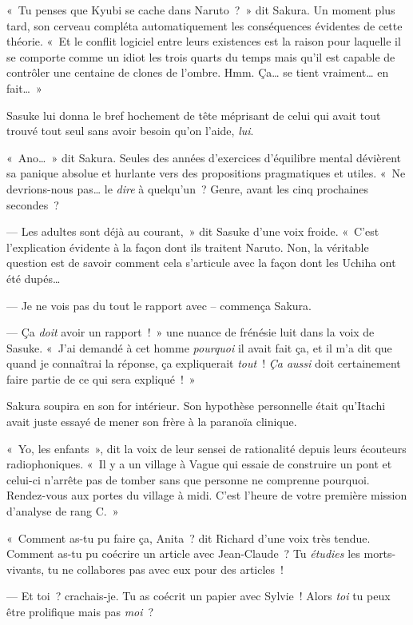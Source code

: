«~Tu penses que Kyubi se cache dans Naruto~?~»
dit Sakura.
Un moment plus tard, son cerveau compléta automatiquement les conséquences évidentes de cette théorie.
«~Et le conflit logiciel entre leurs existences est la raison pour laquelle il se comporte comme un idiot les trois quarts du temps mais qu'il est capable de contrôler une centaine de clones de l'ombre.
Hmm. Ça… se tient vraiment… en fait…~»

Sasuke lui donna le bref hochement de tête méprisant de celui qui avait tout trouvé tout seul sans avoir besoin qu'on l'aide, \emph{lui}.

«~Ano…~» dit Sakura.
Seules des années d'exercices d'équilibre mental dévièrent sa panique absolue et hurlante vers des propositions pragmatiques et utiles.
«~Ne devrions-nous pas… le \emph{dire} à quelqu'un~?
Genre, avant les cinq prochaines secondes~?

--- Les adultes sont déjà au courant,~» dit Sasuke d'une voix froide.
«~C'est l'explication évidente à la façon dont ils traitent Naruto.
Non, la véritable question est de savoir comment cela s'articule avec la façon dont les Uchiha ont été dupés…

--- Je ne vois pas du tout le rapport avec -- commença Sakura.

--- Ça \emph{doit} avoir un rapport~!~»
une nuance de frénésie luit dans la voix de Sasuke.
«~J'ai demandé à cet homme \emph{pourquoi} il avait fait ça, et il m'a dit que quand je connaîtrai la réponse, ça expliquerait \emph{tout}~!
\emph{Ça aussi} doit certainement faire partie de ce qui sera expliqué~!~»

Sakura soupira en son for intérieur.
Son hypothèse personnelle était qu'Itachi avait juste essayé de mener son frère à la paranoïa clinique.

«~Yo, les enfants~», dit la voix de leur sensei de rationalité depuis leurs écouteurs radiophoniques.
«~Il y a un village à Vague qui essaie de construire un pont et celui-ci n'arrête pas de tomber sans que personne ne comprenne pourquoi.
Rendez-vous aux portes du village à midi.
C'est l'heure de votre première mission d'analyse de rang C.~»

\clearpage
{}

«~Comment as-tu pu faire ça, Anita~? dit Richard d'une voix très tendue.
Comment as-tu pu coécrire un article avec Jean-Claude~?
Tu \emph{étudies} les morts-vivants, tu ne collabores pas avec eux pour des articles~!

--- Et toi~? crachais-je.
Tu as coécrit un papier avec Sylvie~!
Alors \emph{toi} tu peux être prolifique mais pas \emph{moi}~?

